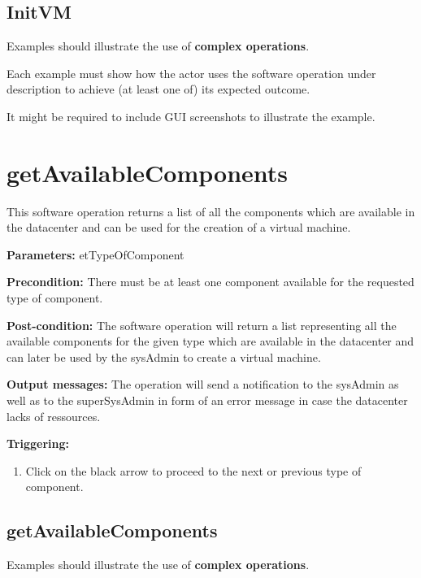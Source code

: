 \subsection{InitVM}
Examples should illustrate the use of \textbf{complex operations}.

Each example must show how the actor uses the software operation under
description to achieve (at least one of) its expected outcome.

It might be required to include GUI screenshots to illustrate the example.








\section{getAvailableComponents}
\label{operation:getAvailableComponents}
This software operation returns a list of all the components which are available
in the datacenter and can be used for the creation of a virtual machine.
\begin{description}

\item \textbf{Parameters:} etTypeOfComponent
\item \textbf{Precondition:} There must be at least one component available for
the requested type of component.
\item \textbf{Post-condition:} The software operation will return a list
representing all the available components for the given type which are available
in the datacenter and can later be used by the sysAdmin to create a virtual machine.

\item \textbf{Output messages:} The operation will send a notification to the
sysAdmin as well as to the superSysAdmin in form of an error message in case the
datacenter lacks of ressources.

\item \textbf{Triggering:}
\begin{enumerate}
\item Click on the black arrow to proceed to the next or previous type of
component.
\end{enumerate}

 
\end{description}

\subsection{getAvailableComponents}
Examples should illustrate the use of \textbf{complex operations}.

